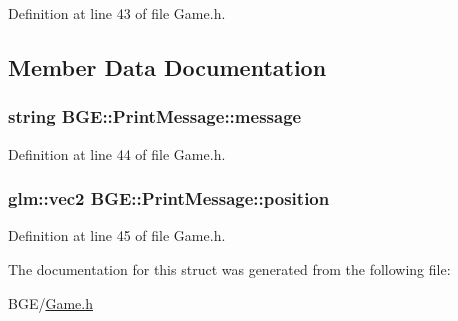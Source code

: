 Definition at line 43 of file Game.\-h.



\subsection{Member Data Documentation}
\hypertarget{struct_b_g_e_1_1_print_message_a8650b93e59220dea4d57422188ed3b29}{
\subsubsection[{message}]{\setlength{\rightskip}{0pt plus 5cm}string B\-G\-E\-::\-Print\-Message\-::message}}\label{struct_b_g_e_1_1_print_message_a8650b93e59220dea4d57422188ed3b29}


Definition at line 44 of file Game.\-h.

\hypertarget{struct_b_g_e_1_1_print_message_ac3919368c693f86ee5fc7217df8e7d1b}{
\subsubsection[{position}]{\setlength{\rightskip}{0pt plus 5cm}glm\-::vec2 B\-G\-E\-::\-Print\-Message\-::position}}\label{struct_b_g_e_1_1_print_message_ac3919368c693f86ee5fc7217df8e7d1b}


Definition at line 45 of file Game.\-h.



The documentation for this struct was generated from the following file\-:\begin{DoxyCompactItemize}
\item 
B\-G\-E/\hyperlink{_game_8h}{Game.\-h}\end{DoxyCompactItemize}
